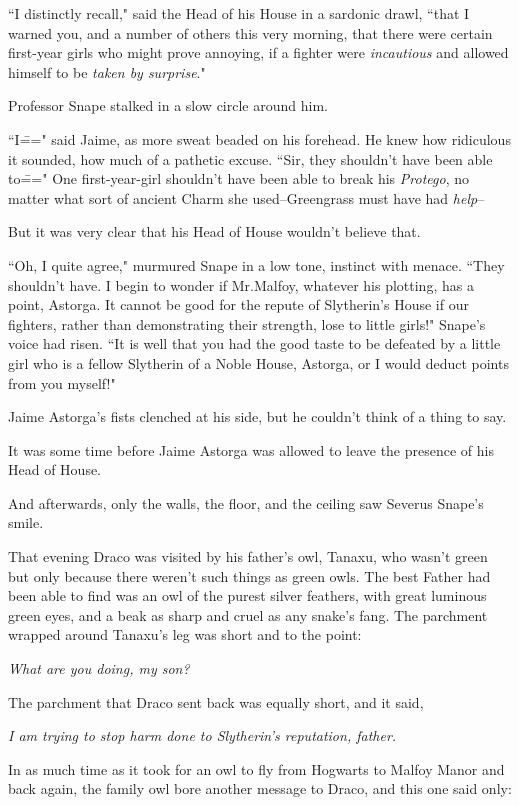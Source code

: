 ``I distinctly recall," said the Head of his House in a sardonic drawl, ``that I warned you, and a number of others this very morning, that there were certain first-year girls who might prove annoying, if a fighter were \emph{incautious} and allowed himself to be \emph{taken by surprise}."

Professor Snape stalked in a slow circle around him.

``I\===" said Jaime, as more sweat beaded on his forehead. He knew how ridiculous it sounded, how much of a pathetic excuse. ``Sir, they shouldn't have been able to\===" One first-year-girl shouldn't have been able to break his \emph{Protego}, no matter what sort of ancient Charm she used\---Greengrass must have had \emph{help}\---

But it was very clear that his Head of House wouldn't believe that.

``Oh, I quite agree," murmured Snape in a low tone, instinct with menace. ``They shouldn't have. I begin to wonder if Mr.\?Malfoy, whatever his plotting, has a point, Astorga. It cannot be good for the repute of Slytherin's House if our fighters, rather than demonstrating their strength, lose to little girls!" Snape's voice had risen. ``It is well that you had the good taste to be defeated by a little girl who is a fellow Slytherin of a Noble House, Astorga, or I would deduct points from you myself!"

Jaime Astorga's fists clenched at his side, but he couldn't think of a thing to say.

It was some time before Jaime Astorga was allowed to leave the presence of his Head of House.

And afterwards, only the walls, the floor, and the ceiling saw Severus Snape's smile.

\later

That evening Draco was visited by his father's owl, Tanaxu, who wasn't green but only because there weren't such things as green owls. The best Father had been able to find was an owl of the purest silver feathers, with great luminous green eyes, and a beak as sharp and cruel as any snake's fang. The parchment wrapped around Tanaxu's leg was short and to the point:

\emph{What are you doing, my son?}

The parchment that Draco sent back was equally short, and it said,

\emph{I am trying to stop harm done to Slytherin's reputation, father.}

In as much time as it took for an owl to fly from Hogwarts to Malfoy Manor and back again, the family owl bore another message to Draco, and this one said only:

